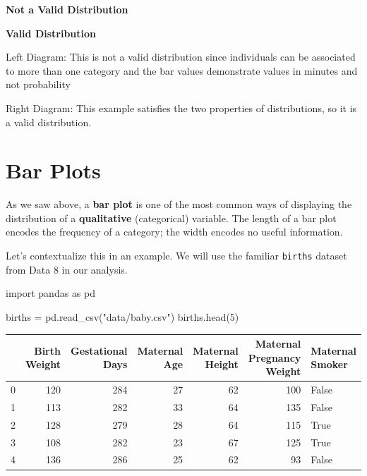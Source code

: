 \documentclass[
  letterpaper,
  DIV=11,
  numbers=noendperiod]{scrreprt}
\newenvironment{Shaded}{\begin{snugshade}}{\end{snugshade}}
\newcommand{\DecValTok}[1]{\textcolor[rgb]{0.68,0.00,0.00}{#1}}
\newcommand{\ImportTok}[1]{\textcolor[rgb]{0.00,0.46,0.62}{#1}}
\newcommand{\NormalTok}[1]{\textcolor[rgb]{0.00,0.23,0.31}{#1}}
\newcommand{\OperatorTok}[1]{\textcolor[rgb]{0.37,0.37,0.37}{#1}}
\newcommand{\StringTok}[1]{\textcolor[rgb]{0.13,0.47,0.30}{#1}}
\begin{document}
\textbf{Not a Valid Distribution}

\textbf{Valid Distribution}

Left Diagram: This is not a valid distribution since individuals can be
associated to more than one category and the bar values demonstrate
values in minutes and not probability

Right Diagram: This example satisfies the two properties of
distributions, so it is a valid distribution.

\hypertarget{bar-plots}{%
\section{Bar Plots}\label{bar-plots}}

As we saw above, a \textbf{bar plot} is one of the most common ways of
displaying the distribution of a \textbf{qualitative} (categorical)
variable. The length of a bar plot encodes the frequency of a category;
the width encodes no useful information.

Let's contextualize this in an example. We will use the familiar
\texttt{births} dataset from Data 8 in our analysis.

\begin{Shaded}
\begin{Highlighting}[]
\ImportTok{import}\NormalTok{ pandas }\ImportTok{as}\NormalTok{ pd}

\NormalTok{births }\OperatorTok{=}\NormalTok{ pd.read\_csv(}\StringTok{"data/baby.csv"}\NormalTok{)}
\NormalTok{births.head(}\DecValTok{5}\NormalTok{)}
\end{Highlighting}
\end{Shaded}

\begin{tabular}{lrrrrrl}
\toprule
{} &  Birth Weight &  Gestational Days &  Maternal Age &  Maternal Height &  Maternal Pregnancy Weight &  Maternal Smoker \\
\midrule
0 &           120 &               284 &            27 &               62 &                        100 &            False \\
1 &           113 &               282 &            33 &               64 &                        135 &            False \\
2 &           128 &               279 &            28 &               64 &                        115 &             True \\
3 &           108 &               282 &            23 &               67 &                        125 &             True \\
4 &           136 &               286 &            25 &               62 &                         93 &            False \\
\bottomrule
\end{tabular}
\end{document}
